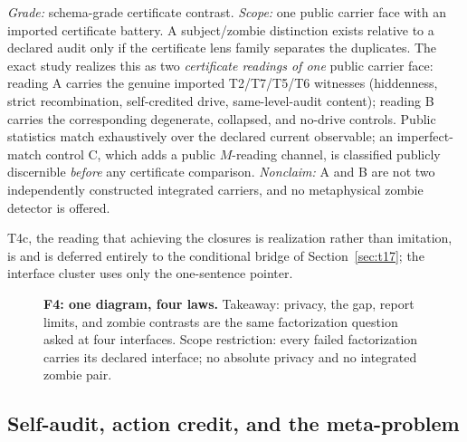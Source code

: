\begin{theorem}
\gradeS{} \emph{Grade:} schema-grade certificate contrast. \emph{Scope:} one
public carrier face with an imported certificate battery. A subject/zombie
distinction exists relative to a declared audit only if the certificate lens
family separates the duplicates. The exact study realizes this as two
\emph{certificate readings of one} public carrier face: reading A carries the
genuine imported T2/T7/T5/T6 witnesses (hiddenness, strict recombination,
self-credited drive, same-level-audit content); reading B carries the
corresponding degenerate, collapsed, and no-drive controls. Public statistics
match exhaustively over the declared current observable; an imperfect-match
control C, which adds a public $M$-reading channel, is classified publicly
discernible \emph{before} any certificate comparison. \emph{Nonclaim:} A and
B are not two independently constructed integrated carriers, and no
metaphysical zombie detector is offered.
\end{theorem}

T4c, the reading that achieving the closures is realization rather than
imitation, is \gradeO{} and is deferred entirely to the conditional bridge
of Section~\ref{sec:t17}; the interface cluster uses only the one-sentence
pointer.

\begin{figure}[t]
\centering
{}
\caption{\textbf{F4: one diagram, four laws.} Takeaway: privacy, the gap,
report limits, and zombie contrasts are the same factorization question asked
at four interfaces. Scope restriction: every failed factorization carries its
declared interface; no absolute privacy and no integrated zombie pair.}
\label{fig:interface}
\end{figure}

\subsection{Self-audit, action credit, and the meta-problem}
\label{sec:selfaudit}

